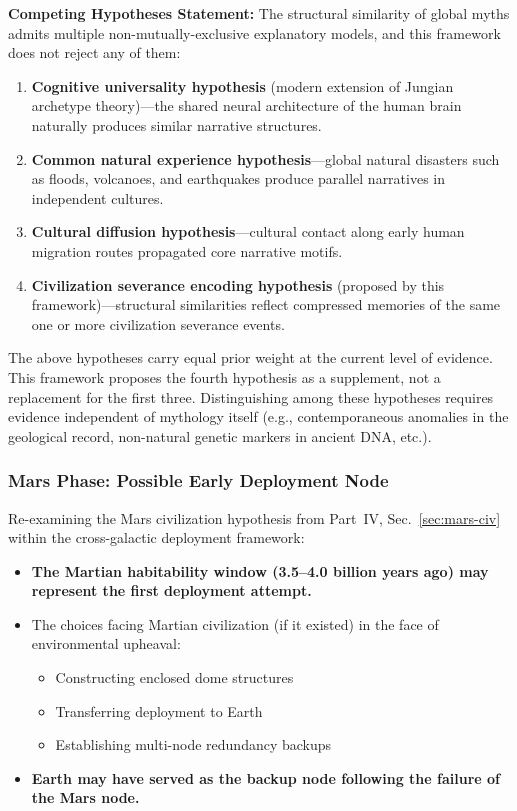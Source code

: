 \documentclass[aps,prd,twocolumn,superscriptaddress,nofootinbib]{revtex4-2}
\begin{document}
\textbf{Competing Hypotheses Statement:} The structural similarity of global myths admits multiple non-mutually-exclusive explanatory models, and this framework does not reject any of them:

\begin{enumerate}
  \item \textbf{Cognitive universality hypothesis} (modern extension of Jungian archetype theory)---the shared neural architecture of the human brain naturally produces similar narrative structures.
  \item \textbf{Common natural experience hypothesis}---global natural disasters such as floods, volcanoes, and earthquakes produce parallel narratives in independent cultures.
  \item \textbf{Cultural diffusion hypothesis}---cultural contact along early human migration routes propagated core narrative motifs.
  \item \textbf{Civilization severance encoding hypothesis} (proposed by this framework)---structural similarities reflect compressed memories of the same one or more civilization severance events.
\end{enumerate}

The above hypotheses carry equal prior weight at the current level of evidence. This framework proposes the fourth hypothesis as a supplement, not a replacement for the first three. Distinguishing among these hypotheses requires evidence independent of mythology itself (e.g., contemporaneous anomalies in the geological record, non-natural genetic markers in ancient DNA, etc.).

\subsubsection{Mars Phase: Possible Early Deployment Node}\label{sec:mars-phase}

Re-examining the Mars civilization hypothesis from Part~IV, Sec.~\ref{sec:mars-civ} within the cross-galactic deployment framework:

\begin{itemize}
  \item \textbf{The Martian habitability window (3.5--4.0 billion years ago) may represent the first deployment attempt.}
  \item The choices facing Martian civilization (if it existed) in the face of environmental upheaval:
  \begin{itemize}
    \item Constructing enclosed dome structures
    \item Transferring deployment to Earth
    \item Establishing multi-node redundancy backups
  \end{itemize}
  \item \textbf{Earth may have served as the backup node following the failure of the Mars node.}
\end{itemize}
\end{document}
